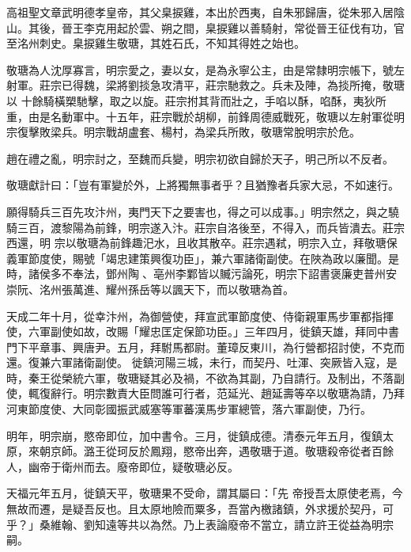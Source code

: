 
\begin{pinyinscope}

 高祖聖文章武明德孝皇帝，其父臬捩雞，本出於西夷，自朱邪歸唐，從朱邪入居陰山。其後，晉王李克用起於雲、朔之間，臬捩雞以善騎射，常從晉王征伐有功，官至洺州刺史。臬捩雞生敬瑭，其姓石氏，不知其得姓之始也。



 敬瑭為人沈厚寡言，明宗愛之，妻以女，是為永寧公主，由是常隸明宗帳下，號左射軍。莊宗已得魏，梁將劉掞急攻清平，莊宗馳救之。兵未及陣，為掞所掩，敬瑭以
 十餘騎橫槊馳擊，取之以旋。莊宗拊其背而壯之，手啗以酥，啗酥，夷狄所重，由是名動軍中。十五年，莊宗戰於胡柳，前鋒周德威戰死，敬瑭以左射軍從明宗復擊敗梁兵。明宗戰胡盧套、楊村，為梁兵所敗，敬瑭常脫明宗於危。



 趙在禮之亂，明宗討之，至魏而兵變，明宗初欲自歸於天子，明己所以不反者。



 敬瑭獻計曰：「豈有軍變於外，上將獨無事者乎？且猶豫者兵家大忌，不如速行。



 願得騎兵三百先攻汴州，夷門天下之要害也，得之可以成事。」明宗然之，與之驍騎三百，渡黎陽為前鋒，明宗遂入汴。莊宗自洛後至，不得入，而兵皆潰去。莊宗西還，明
 宗以敬瑭為前鋒趣汜水，且收其散卒。莊宗遇弒，明宗入立，拜敬瑭保義軍節度使，賜號「竭忠建策興復功臣」，兼六軍諸衛副使。在陜為政以廉聞。是時，諸侯多不奉法，鄧州陶、亳州李鄴皆以贓污論死，明宗下詔書褒廉吏普州安崇阮、洺州張萬進、耀州孫岳等以諷天下，而以敬瑭為首。



 天成二年十月，從幸汴州，為御營使，拜宣武軍節度使、侍衛親軍馬步軍都指揮使，六軍副使如故，改賜「耀忠匡定保節功臣。」三年四月，徙鎮天雄，拜同中書門下平章事、興唐尹。五月，拜駙馬都尉。董璋反東川，為行營都招討使，不克而還。復兼六軍諸衛副使。
 徙鎮河陽三城，未行，而契丹、吐渾、突厥皆入寇，是時，秦王從榮統六軍，敬瑭疑其必及禍，不欲為其副，乃自請行。及制出，不落副使，輒復辭行。明宗數責大臣問誰可行者，范延光、趙延壽等卒以敬瑭為請，乃拜河東節度使、大同彰國振武威塞等軍蕃漢馬步軍總管，落六軍副使，乃行。



 明年，明宗崩，愍帝即位，加中書令。三月，徙鎮成德。清泰元年五月，復鎮太原，來朝京師。潞王從珂反於鳳翔，愍帝出奔，遇敬瑭于道。敬瑭殺帝從者百餘人，幽帝于衛州而去。廢帝即位，疑敬瑭必反。



 天福元年五月，徙鎮天平，敬瑭果不受命，謂其屬曰：「先
 帝授吾太原使老焉，今無故而遷，是疑吾反也。且太原地險而粟多，吾當內檄諸鎮，外求援於契丹，可乎？」桑維翰、劉知遠等共以為然。乃上表論廢帝不當立，請立許王從益為明宗嗣。




\end{pinyinscope}
